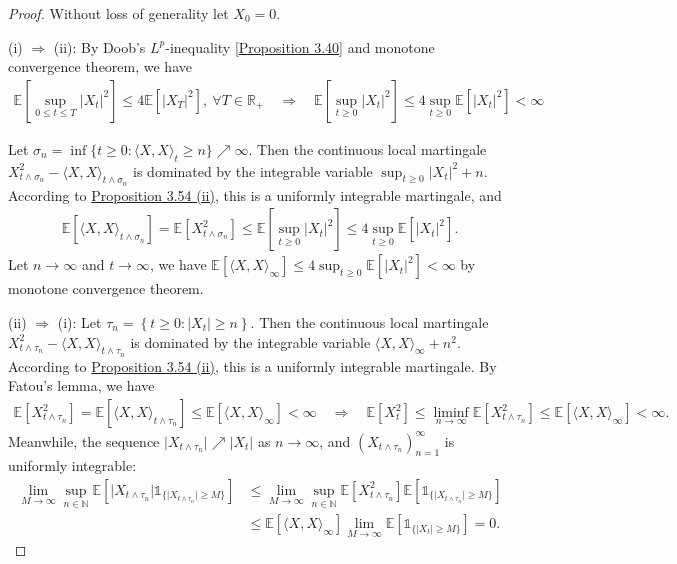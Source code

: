 \documentclass{article}
\numberwithin{equation}{section}
\newcommand{\E}{\mathbb{E}}
\theoremstyle{plain}
\theoremstyle{definition}
\begin{document}
\begin{proof}
Without loss of generality let $X_0=0$. 

(i) $\Rightarrow$ (ii): By Doob's $L^p$-inequality [\hyperref[prop:3.40]{Proposition 3.40}] and monotone convergence theorem, we have
\begin{align*}
	\E\left[\sup_{0\leq t\leq T}\vert X_t\vert^2\right]\leq 4\E[\vert X_T\vert^2],\ \forall T\in\mathbb{R}_+ \quad\Rightarrow\quad \E\left[\sup_{t\geq 0}\vert X_t\vert^2\right]\leq 4\sup_{t\geq 0}\E[\vert X_t\vert^2] < \infty
\end{align*}

Let $\sigma_n=\inf\{t\geq 0:\langle X,X\rangle_t\geq n\}\nearrow\infty$. Then the continuous local martingale $X_{t\wedge\sigma_n}^2-\langle X,X\rangle_{t\wedge\sigma_n}$ is dominated by the integrable variable $\sup_{t\geq 0}\vert X_t\vert^2 + n$. According to \hyperref[prop:3.54]{Proposition 3.54 (ii)}, this is a uniformly integrable martingale, and
\begin{align*}
	\E\left[\langle X,X\rangle_{t\wedge\sigma_n}\right]=\E\left[X_{t\wedge\sigma_n}^2\right]\leq\E\left[\sup_{t\geq 0}\vert X_t\vert^2\right]\leq 4\sup_{t\geq 0}\E[\vert X_t\vert^2].
\end{align*}
Let $n\to\infty$ and $t\to\infty$, we have $\E[\langle X,X\rangle_\infty]\leq4\sup_{t\geq 0}\E[\vert X_t\vert^2]<\infty$ by monotone convergence theorem. \vspace{0.1cm}

(ii) $\Rightarrow$ (i): Let $\tau_n=\left\{t\geq 0:\vert X_t\vert\geq n\right\}$. Then the continuous local martingale $X_{t\wedge\tau_n}^2-\langle X,X\rangle_{t\wedge\tau_n}$ is dominated by the integrable variable $\langle X,X\rangle_\infty + n^2$. According to \hyperref[prop:3.54]{Proposition 3.54 (ii)}, this is a uniformly integrable martingale. By Fatou's lemma, we have
\begin{align*}
	\E\left[X_{t\wedge\tau_n}^2\right]=\E\left[\langle X,X\rangle_{t\wedge\tau_n}\right]\leq\E\left[\langle X,X\rangle_\infty\right] < \infty\quad\Rightarrow\quad \E[X^2_t]\leq\liminf_{n\to\infty}\E\left[X_{t\wedge\tau_n}^2\right]\leq\E\left[\langle X,X\rangle_\infty\right]<\infty.
\end{align*}
Meanwhile, the sequence $\vert X_{t\wedge\tau_n}\vert\nearrow\vert X_t\vert$ as $n\to\infty$, and $(X_{t\wedge\tau_n})_{n=1}^\infty$ is uniformly integrable:
\begin{align*}
	\lim_{M\to\infty}\sup_{n\in\mathbb{N}}\E\left[\vert X_{t\wedge\tau_n}\vert\mathds{1}_{\{\vert X_{t\wedge\tau_n}\vert\geq M\}}\right]&\leq \lim_{M\to\infty}\sup_{n\in\mathbb{N}}\E\left[X_{t\wedge\tau_n}^2\right]\E\left[\mathds{1}_{\{\vert X_{t\wedge\tau_n}\vert\geq M\}}\right]\\
	&\leq\E\left[\langle X,X\rangle_\infty\right]\lim_{M\to\infty}\E\left[\mathds{1}_{\{\vert X_t\vert\geq M\}}\right]=0.
\end{align*}


\end{proof}
\end{document}
